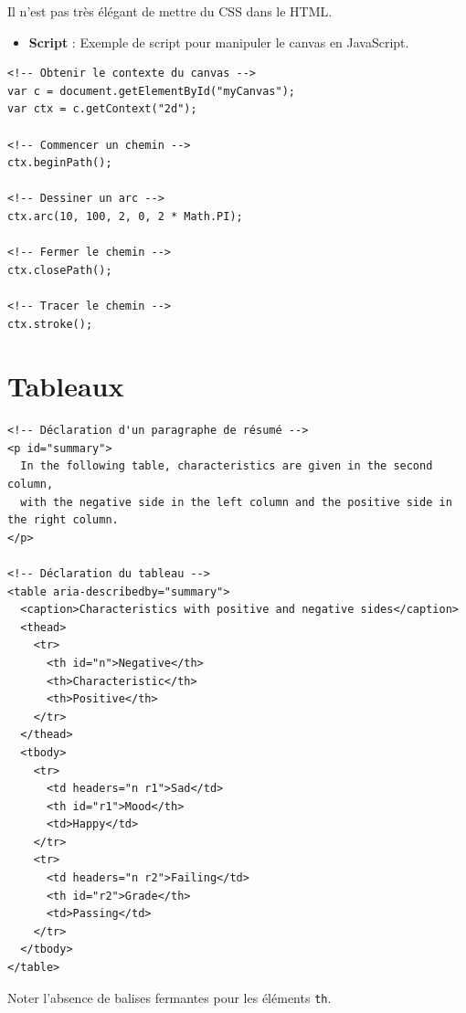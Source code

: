 \documentclass{report}
\begin{document}
\begin{multicols*}{2}
\begin{note}{}{}
   Il n'est pas très élégant de mettre du CSS dans le HTML.   
\end{note}



\begin{itemize}
    \item \textbf{Script} : Exemple de script pour manipuler le canvas en JavaScript.
\end{itemize}

\begin{lstlisting}[style=HTMLDraculaDark]
<!-- Obtenir le contexte du canvas -->
var c = document.getElementById("myCanvas");
var ctx = c.getContext("2d");

<!-- Commencer un chemin -->
ctx.beginPath();

<!-- Dessiner un arc -->
ctx.arc(10, 100, 2, 0, 2 * Math.PI);

<!-- Fermer le chemin -->
ctx.closePath();

<!-- Tracer le chemin -->
ctx.stroke();
\end{lstlisting}


\section{Tableaux}


\begin{lstlisting}[style=HTMLDraculaDark]
<!-- Déclaration d'un paragraphe de résumé -->
<p id="summary">
  In the following table, characteristics are given in the second column,
  with the negative side in the left column and the positive side in the right column.
</p>

<!-- Déclaration du tableau -->
<table aria-describedby="summary">
  <caption>Characteristics with positive and negative sides</caption>
  <thead>
    <tr>
      <th id="n">Negative</th>
      <th>Characteristic</th>
      <th>Positive</th>
    </tr>
  </thead>
  <tbody>
    <tr>
      <td headers="n r1">Sad</td>
      <th id="r1">Mood</th>
      <td>Happy</td>
    </tr>
    <tr>
      <td headers="n r2">Failing</td>
      <th id="r2">Grade</th>
      <td>Passing</td>
    </tr>
  </tbody>
</table>
\end{lstlisting}


\begin{note}{}{}
     Noter l’absence de balises fermantes pour les éléments \texttt{th}.   
\end{note}



\end{multicols*}
\end{document}
